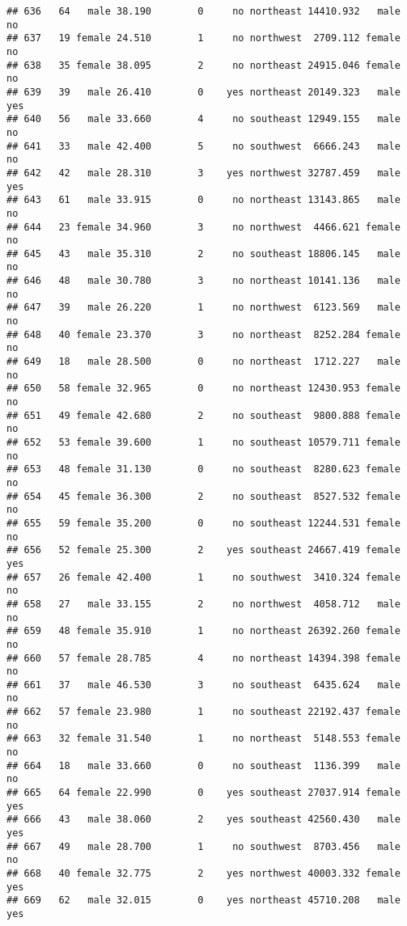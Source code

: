 \documentclass[
]{article}
\begin{document}
\begin{verbatim}
## 636   64   male 38.190        0     no northeast 14410.932   male       no
## 637   19 female 24.510        1     no northwest  2709.112 female       no
## 638   35 female 38.095        2     no northeast 24915.046 female       no
## 639   39   male 26.410        0    yes northeast 20149.323   male      yes
## 640   56   male 33.660        4     no southeast 12949.155   male       no
## 641   33   male 42.400        5     no southwest  6666.243   male       no
## 642   42   male 28.310        3    yes northwest 32787.459   male      yes
## 643   61   male 33.915        0     no northeast 13143.865   male       no
## 644   23 female 34.960        3     no northwest  4466.621 female       no
## 645   43   male 35.310        2     no southeast 18806.145   male       no
## 646   48   male 30.780        3     no northeast 10141.136   male       no
## 647   39   male 26.220        1     no northwest  6123.569   male       no
## 648   40 female 23.370        3     no northeast  8252.284 female       no
## 649   18   male 28.500        0     no northeast  1712.227   male       no
## 650   58 female 32.965        0     no northeast 12430.953 female       no
## 651   49 female 42.680        2     no southeast  9800.888 female       no
## 652   53 female 39.600        1     no southeast 10579.711 female       no
## 653   48 female 31.130        0     no southeast  8280.623 female       no
## 654   45 female 36.300        2     no southeast  8527.532 female       no
## 655   59 female 35.200        0     no southeast 12244.531 female       no
## 656   52 female 25.300        2    yes southeast 24667.419 female      yes
## 657   26 female 42.400        1     no southwest  3410.324 female       no
## 658   27   male 33.155        2     no northwest  4058.712   male       no
## 659   48 female 35.910        1     no northeast 26392.260 female       no
## 660   57 female 28.785        4     no northeast 14394.398 female       no
## 661   37   male 46.530        3     no southeast  6435.624   male       no
## 662   57 female 23.980        1     no southeast 22192.437 female       no
## 663   32 female 31.540        1     no northeast  5148.553 female       no
## 664   18   male 33.660        0     no southeast  1136.399   male       no
## 665   64 female 22.990        0    yes southeast 27037.914 female      yes
## 666   43   male 38.060        2    yes southeast 42560.430   male      yes
## 667   49   male 28.700        1     no southwest  8703.456   male       no
## 668   40 female 32.775        2    yes northwest 40003.332 female      yes
## 669   62   male 32.015        0    yes northeast 45710.208   male      yes

\end{verbatim}
\end{document}
